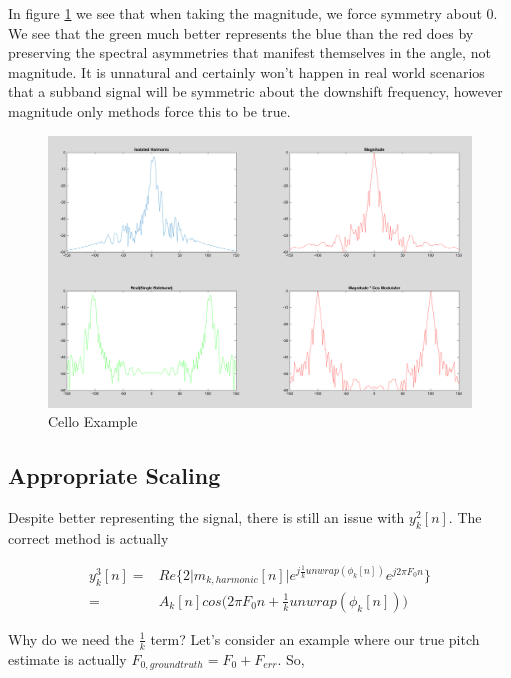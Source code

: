 \documentclass [11pt, proquest] {uwthesis}[2015/03/03]
\begin{document}
In figure \ref{fig:real_vs_magnitude_example} we see that when taking the magnitude, we force symmetry about $0$.  We see that the green much better represents the blue than the red does by preserving the spectral asymmetries that manifest themselves in the angle, not magnitude.  It is unnatural and certainly won't happen in real world scenarios that a subband signal will be symmetric about the downshift frequency, however magnitude only methods force this to be true.

\begin{figure}[!ht]
  \centering
    \includegraphics[width=1\textwidth]{real_vs_magnitude_example}   
    \caption{Cello Example}
    \label{fig:real_vs_magnitude_example}
\end{figure}

\subsection{Appropriate Scaling}

Despite better representing the signal, there is still an issue with $y_k^2[n]$.  The correct method is actually

\begin{align}
\label{eq:realVSmag3}
y_k^3[n] =& Re\{ 2 \vert m_{k,harmonic}[n]  \vert e^{j \frac{1}{k} unwrap(\phi_k[n])} e^{j2\pi F_0 n} \}  \\
=& A_k[n]cos\Big(2\pi F_0 n + \frac{1}{k}unwrap(\phi_k[n])\Big) \nonumber
\end{align}


Why do we need the $\frac{1}{k}$ term?  Let's consider an example where our true pitch estimate is actually $F_{0,ground truth} = F_0 + F_{err}$.  So,
\end{document}
